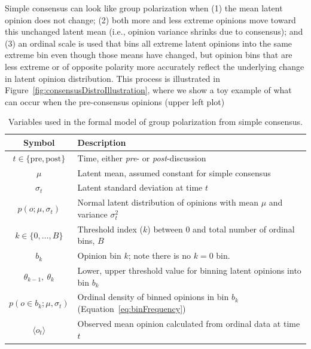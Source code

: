 \documentclass[11pt, letterpaper]{article}
\begin{document}
Simple consensus can look like group polarization when (1) the mean latent opinion
does not change; (2) both more and less extreme opinions move toward this 
unchanged latent mean (i.e., opinion variance shrinks due to consensus); 
and (3) an ordinal scale is used that bins all extreme
latent opinions into the same extreme bin even though those means have changed,
but opinion bins that are less extreme or of opposite polarity more accurately
reflect the underlying change in latent opinion distribution. This process is
illustrated in Figure~\ref{fig:consensusDistroIllustration}, where we show
a toy example of what can occur when the pre-consensus
opinions (upper left plot) 

\begin{table}[h]
  \caption{Variables used in the formal model of group polarization from simple consensus.}
  \label{tab:modelVariables}
  \begin{tabular}{cp{5.0in}} \toprule
   Symbol & Description  \\ \midrule  
   $t \in \{\mathrm{pre}, \mathrm{post}\}$ & Time, either \emph{pre}- or
                                           \emph{post}-discussion \\
   $\mu$  &   Latent mean, assumed constant for simple consensus \\ 
   $\sigma_t$ & Latent standard deviation at time $t$ \\
   $p(o;\mu,\sigma_t)$ & Normal latent distribution of opinions with mean
                         $\mu$ and variance $\sigma_t^2$ \\
   $k \in \{0,\ldots,B\} $ & Threshold index ($k$) between 0 and total number of
         ordinal bins, $B$ \\
   $b_k$ & Opinion bin $k$; note there is no $k=0$ bin. \\
   $\theta_{k-1},~\theta_k$  & Lower, upper threshold value for binning latent opinions into
     bin $b_k$ \\
   $p(o \in b_k; \mu, \sigma_t)$ & Ordinal density of binned opinions in bin $b_k$ 
            (Equation~\ref{eq:binFrequency}) \\
   $\langle o_t \rangle$  &   Observed mean opinion calculated from ordinal data at time $t$ \\
   \bottomrule
  \end{tabular} 
\end{table}
\end{document}
